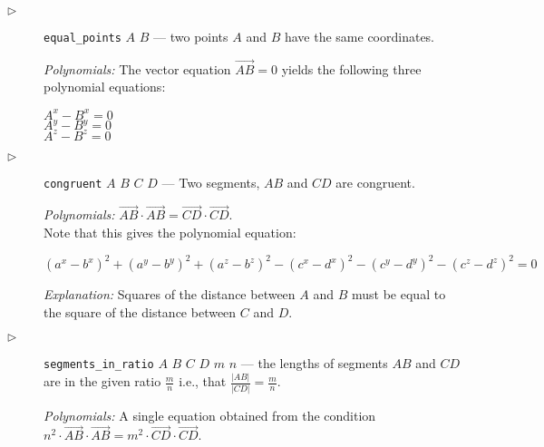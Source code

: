 \documentclass[final,1p,times,authoryear]{elsarticle}
\begin{document}
\begin{description}
\item[$\triangleright$] {\tt equal\_points} $A$ $B$ --- two points $A$
  and $B$ have the same coordinates.

  {\em Polynomials:} The vector equation $\overrightarrow{AB} = 0$
  yields the following three polynomial equations:
  \begin{tabbing}
    $A^x - B^x = 0$\\
    $A^y - B^y = 0$\\
    $A^z - B^z = 0$
  \end{tabbing}


\item[$\triangleright$] {\tt congruent} $A$ $B$ $C$ $D$ --- Two
  segments, $AB$ and $CD$ are congruent.


{\em Polynomials:}
$\overrightarrow{AB} \cdot \overrightarrow{AB} = \overrightarrow{CD} \cdot \overrightarrow{CD}$. \\
Note that this gives the polynomial equation:

$$({a^x} - {b^x})^2 + ({a^y} - {b^y})^2 + ({a^z} - {b^z})^2 - ({c^x} - {d^x})^2 - ({c^y} - {d^y})^2 - ({c^z} - {d^z})^2 = 0$$

{\em Explanation:} Squares of the distance between $A$ and $B$ must be
equal to the square of the distance between $C$ and $D$.

\item[$\triangleright$] {\tt segments\_in\_ratio} $A$ $B$ $C$ $D$
  $m$ $n$ --- the lengths of segments $AB$ and
  $CD$ are in the given ratio $\frac{m}{n}$ i.e., that
  $\frac{|AB|}{|CD|} = \frac{m}{n}$.

{\em Polynomials:} A single equation obtained from the condition
$n^2 \cdot \overrightarrow{AB} \cdot \overrightarrow{AB} = m^2 \cdot \overrightarrow{CD} \cdot \overrightarrow{CD}$.


\end{description}
\end{document}
